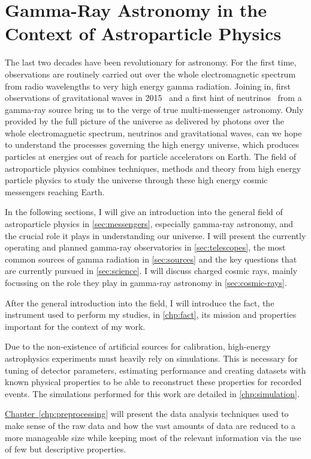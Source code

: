 \chapter{Gamma-Ray Astronomy in the Context of Astroparticle Physics}

The last two decades have been revolutionary for astronomy.
For the first time, observations are routinely carried out over the whole
electromagnetic spectrum from radio wavelengths to very high energy gamma radiation.
Joining in, first observations of gravitational waves in 2015~\cite{ligo-bbm}
and a first hint of neutrinos~\cite{txs} from a gamma-ray source bring us to the verge of true multi-messenger astronomy. 
Only provided by the full picture of the universe as delivered by photons
over the whole electromagnetic spectrum, neutrinos and gravitational waves,
can we hope to understand the processes governing the high energy universe,
which produces particles at energies out of reach for particle accelerators on Earth.
The field of astroparticle physics combines techniques, methods and theory from high energy
particle physics to study the universe through these high energy cosmic messengers 
reaching Earth.

In the following sections, I will give an introduction into the general field
of astroparticle physics in \autoref{sec:messengers},
especially gamma-ray astronomy, and the crucial role it plays in understanding our universe.
I will present the currently operating and planned gamma-ray observatories in \autoref{sec:telescopes},
the most common sources of gamma radiation in \autoref{sec:sources}
and the key questions that are currently pursued in \autoref{sec:science}.
I will discuss charged cosmic rays, mainly focussing on the role they play in gamma-ray astronomy in \autoref{sec:cosmic-rays}.

After the general introduction into the field, I will introduce the \gls{fact},
the instrument used to perform my studies, in \autoref{chp:fact}, its mission and
properties important for the context of my work.

Due to the non-existence of artificial sources for calibration, 
high-energy astrophysics experiments must heavily rely on simulations.
This is necessary for tuning of detector parameters,
estimating performance and creating datasets with known physical properties
to be able to reconstruct these properties for recorded events.
The simulations performed for this work are detailed in \autoref{chp:simulation}.

\hyperref[chp:preprocessing]{Chapter~}\ref{chp:preprocessing} will present the data analysis techniques used
to make sense of the raw data and how the vast amounts of data are reduced
to a more manageable size while keeping most of the relevant information
via the use of few but descriptive properties.

